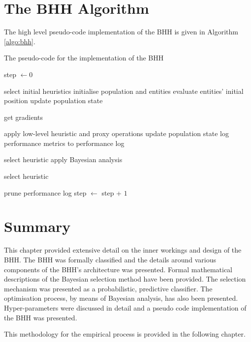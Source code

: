 \section{The \acs{BHH} Algorithm}
\label{sec:bhh:algorithm}

The high level pseudo-code implementation of the \acs{BHH} is given in Algorithm \ref{algo:bhh}.

\begin{algorithm}[htbp]
      \caption{The pseudo-code for the implementation of the \acf{BHH}}
      \label{algo:bhh}
      \begin{algorithmic}
            \State step $\gets 0$

            \State select initial heuristics
            \State initialise population and entities
            \State evaluate entities' initial position
            \State update population state

            \State get gradients
            \EndIf

            \State apply low-level heuristic and proxy operations
            \State update population state
            \State log performance metrics to performance log

            \State select heuristic
            \Else
            \State apply Bayesian analysis
            \EndIf

            \State select heuristic
            \EndIf

            \State prune performance log
            \EndIf
            \EndIf
            \EndFor
            \State step $\gets$ step + $1$
            \EndWhile
      \end{algorithmic}
\end{algorithm}

\section{Summary}
\label{sec:bhh:summary}

This chapter provided extensive detail on the inner workings and design of the \acs{BHH}. The \acs{BHH} was formally classified and the details around various components of the \acs{BHH}'s architecture was presented. Formal mathematical descriptions of the Bayesian selection method have been provided. The selection mechanism was presented as a probabilistic, predictive classifier. The optimisation process, by means of Bayesian analysis, has also been presented. Hyper-parameters were discussed in detail and a pseudo code implementation of the \acs{BHH} was presented.

This methodology for the empirical process is provided in the following chapter.
